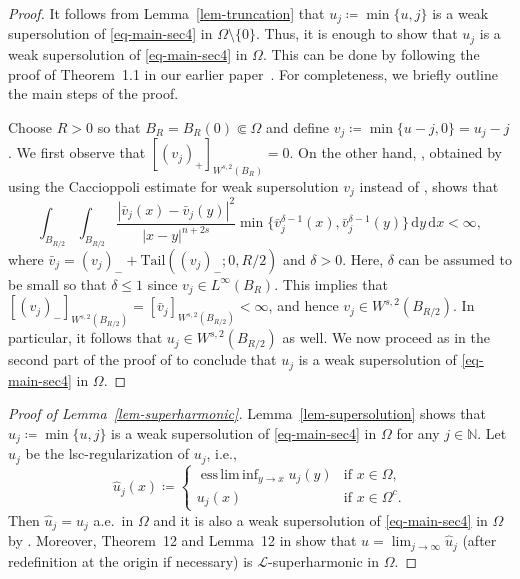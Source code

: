 \documentclass[11pt]{amsart}
\theoremstyle{plain}
\theoremstyle{definition}
\numberwithin{equation}{section}
\DeclareMathOperator*{\essliminf}{ess\,lim\,inf}
\begin{document}
\begin{proof}
It follows from Lemma~\ref{lem-truncation} that $u_j \coloneqq \min\{u, j\}$ is a weak supersolution of \eqref{eq-main-sec4} in $\Omega \setminus \{0\}$. Thus, it is enough to show that $u_j$ is a weak supersolution of \eqref{eq-main-sec4} in $\Omega$. This can be done by following the proof of Theorem~1.1 in our earlier paper~\cite{KL24}. For completeness, we briefly outline the main steps of the proof.

Choose $R>0$ so that $B_{R}=B_{R}(0) \Subset \Omega$ and define $v_j \coloneqq \min\{u-j, 0\}=u_j-j$. We first observe that $[(v_j)_+]_{W^{s, 2}(B_R)}=0$. On the other hand, \cite[Equation~(4.6)]{KL24}, obtained by using the Caccioppoli estimate for weak supersolution $v_j$ instead of \cite[Lemma~3.3]{KL24}, shows that
\begin{equation*}
    \int_{B_{R/2}} \int_{B_{R/2}} \frac{|\bar{v}_j(x)-\bar{v}_j(y)|^2}{|x-y|^{n+2s}} \min\{\bar{v}_j^{\delta-1}(x), \bar{v}_j^{\delta-1}(y)\} \,\mathrm{d}y \,\mathrm{d}x<\infty,
\end{equation*}
where $\bar{v}_j=(v_j)_-+\mathrm{Tail}((v_j)_-; 0, R/2)$ and $\delta>0$. Here, $\delta$ can be assumed to be small so that $\delta\leq 1$ since $v_j \in L^\infty(B_R)$. This implies that $[(v_j)_-]_{W^{s, 2}(B_{R/2})} = [\bar{v}_j]_{W^{s, 2}(B_{R/2})}< \infty$, and hence $v_j \in W^{s, 2}(B_{R/2})$. In particular, it follows that $u_j \in W^{s, 2}(B_{R/2})$ as well. We now proceed as in the second part of the proof of \cite[Theorem~1.1]{KL24} to conclude that $u_j$ is a weak supersolution of \eqref{eq-main-sec4} in $\Omega$.
\end{proof}

\begin{proof}[Proof of Lemma~\ref{lem-superharmonic}]
Lemma~\ref{lem-supersolution} shows that $u_j \coloneqq \min\{u, j\}$ is a weak supersolution of \eqref{eq-main-sec4} in $\Omega$ for any $j \in \mathbb{N}$. Let $\hat{u}_j$ be the lsc-regularization of $u_j$, i.e.,
\begin{equation*}
\hat{u}_j(x) \coloneqq
\begin{cases}
    \essliminf_{y \to x} u_j(y) &\text{if }x \in \Omega, \\
    u_j(x) &\text{if }x \in \Omega^c.
\end{cases}
\end{equation*}
Then $\hat{u}_j=u_j$ a.e.\ in $\Omega$ and it is also a weak supersolution of \eqref{eq-main-sec4} in $\Omega$ by \cite[Theorem~9]{KKP17}. Moreover, Theorem~12 and Lemma~12 in \cite{KKP17} show that $u=\lim_{j\to\infty}\hat{u}_j$ (after redefinition at the origin if necessary) is $\mathcal{L}$-superharmonic in $\Omega$.
\end{proof}
\end{document}
